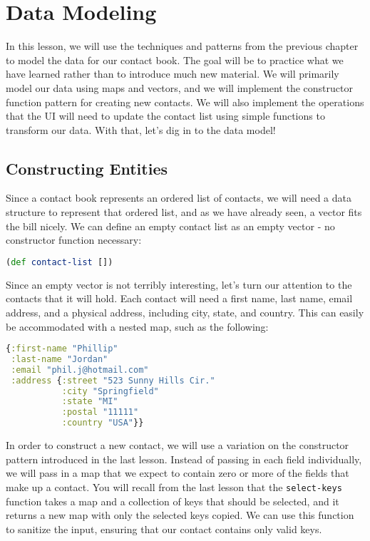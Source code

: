 \documentclass[10pt,twoside,openright]{memoir}
\begin{document}
\section{Data Modeling}

In this lesson, we will use the techniques and patterns from the
previous chapter to model the data for our contact book. The goal will
be to practice what we have learned rather than to introduce much new
material. We will primarily model our data using maps and vectors, and
we will implement the constructor function pattern for creating new
contacts. We will also implement the operations that the UI will need to
update the contact list using simple functions to transform our data.
With that, let's dig in to the data model!


\subsection{Constructing Entities}

Since a contact book represents an ordered list of contacts, we will
need a data structure to represent that ordered list, and as we have
already seen, a vector fits the bill nicely. We can define an empty
contact list as an empty vector - no constructor function necessary:

\begin{lstlisting}[language=Clojure]
(def contact-list [])
\end{lstlisting}

Since an empty vector is not terribly interesting, let's turn our
attention to the contacts that it will hold. Each contact will need a
first name, last name, email address, and a physical address, including
city, state, and country. This can easily be accommodated with a nested
map, such as the following:

\begin{lstlisting}[language=Clojure]
{:first-name "Phillip"
 :last-name "Jordan"
 :email "phil.j@hotmail.com"
 :address {:street "523 Sunny Hills Cir."
           :city "Springfield"
           :state "MI"
           :postal "11111"
           :country "USA"}}
\end{lstlisting}

In order to construct a new contact, we will use a variation on the
constructor pattern introduced in the last lesson. Instead of passing in
each field individually, we will pass in a map that we expect to contain
zero or more of the fields that make up a contact. You will recall from
the last lesson that the \texttt{select-keys} function takes a map and a
collection of keys that should be selected, and it returns a new map
with only the selected keys copied. We can use this function to sanitize
the input, ensuring that our contact contains only valid keys.
\end{document}
